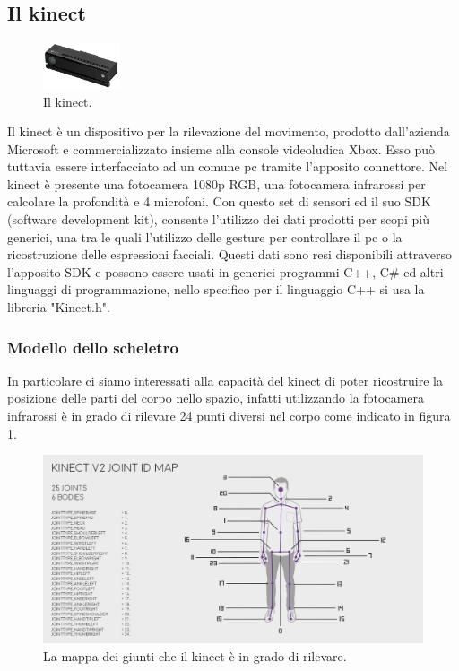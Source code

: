 \documentclass[10pt,a4paper]{article}
\begin{document}
\subsection{Il kinect}

\begin{figure}
	\vspace{-10pt}
  	\centering
   	\includegraphics[width=0.2\textwidth]{kinect.jpg}
  	\vspace{-13pt}
  	\caption{Il kinect.}
  	\vspace{-10pt}
\end{figure}

Il kinect \`e un dispositivo per la rilevazione del movimento, prodotto dall'azienda Microsoft e commercializzato insieme alla console videoludica Xbox. Esso pu\`o tuttavia essere interfacciato ad un comune pc tramite l'apposito connettore. 
Nel kinect \`e presente una fotocamera 1080p RGB, una fotocamera infrarossi per calcolare la profondit\`a e 4 microfoni. Con questo set di sensori ed il suo SDK (software development kit), consente l'utilizzo dei dati prodotti per scopi pi\`u generici, una tra le quali l'utilizzo delle gesture per controllare il pc o la ricostruzione delle espressioni facciali. Questi dati sono resi disponibili attraverso l'apposito SDK e possono essere usati in generici programmi C++, C\# ed altri linguaggi di programmazione, nello specifico per il linguaggio C++ si usa la libreria "Kinect.h".

\subsubsection{Modello dello scheletro}
In particolare ci siamo interessati alla capacit\`a del kinect di poter ricostruire la posizione delle parti del corpo nello spazio, infatti utilizzando la fotocamera infrarossi \`e in grado di rilevare 24 punti diversi nel corpo come indicato in figura \ref{fig:kinmap1}.

\begin{figure}[h]
  	\centering
    \includegraphics[width=1\textwidth]{kinectskeletonmap.png}
  	\caption{La mappa dei giunti che il kinect \`e in grado di rilevare.}
  	\label{fig:kinmap1}
\end{figure}
\end{document}
